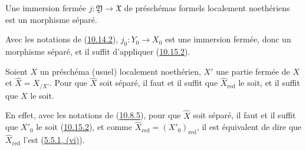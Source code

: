 \begin{proposition}[10.15.6]
\label{I.10.15.6-fr}
Une immersion fermée $j:\mathfrak{Y}\to\mathfrak{X}$ de préschémas formels
localement noethériens est un morphisme séparé.
\end{proposition}

Avec les notations de (\hyperref[I.10.14.2-fr]{10.14.2}),
$j_0:Y_0\to X_0$ est une immersion fermée, donc un morphisme séparé, et il
suffit d'appliquer (\hyperref[I.10.15.2-fr]{10.15.2}).

\begin{proposition}[10.15.7]
\label{I.10.15.7-fr}
Soient $X$ un préschéma (usuel) localement noethérien, $X'$ une partie
fermée de $X$ et $\widehat{X}=X_{/X'}$. Pour que $\widehat{X}$ soit séparé,
il faut et il suffit que $\widehat{X}_{\mathrm{red}}$ le soit, et il suffit
que $X$ le soit.
\end{proposition}

En effet, avec les notations de (\hyperref[I.10.8.5-fr]{10.8.5}), pour que
$\widehat{X}$ soit séparé, il faut et il suffit que $X'_0$ le soit
(\hyperref[I.10.15.2-fr]{10.15.2}), et comme
$\widehat{X}_{\mathrm{red}}=(X'_0)_{\mathrm{red}}$, il est équivalent de
dire que $\widehat{X}_{\mathrm{red}}$ l'est
(\hyperref[I.5.5.1-fr]{5.5.1, (vi)}).
